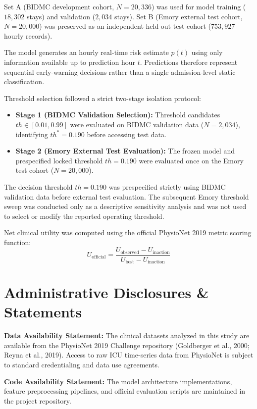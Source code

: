 \documentclass[11pt,a4paper]{article}
\begin{document}
Set A (BIDMC development cohort, $N=20,336$) was used for model training ($18,302$ stays) and validation ($2,034$ stays). Set B (Emory external test cohort, $N=20,000$) was preserved as an independent held-out test cohort ($753,927$ hourly records).

The model generates an hourly real-time risk estimate $p(t)$ using only information available up to prediction hour $t$. Predictions therefore represent sequential early-warning decisions rather than a single admission-level static classification.

Threshold selection followed a strict two-stage isolation protocol:
\begin{itemize}
    \item \textbf{Stage 1 (BIDMC Validation Selection):} Threshold candidates $th \in [0.01, 0.99]$ were evaluated on BIDMC validation data ($N=2,034$), identifying $th^*=0.190$ before accessing test data.
    \item \textbf{Stage 2 (Emory External Test Evaluation):} The frozen model and prespecified locked threshold $th=0.190$ were evaluated once on the Emory test cohort ($N=20,000$).
\end{itemize}

The decision threshold $th=0.190$ was prespecified strictly using BIDMC validation data before external test evaluation. The subsequent Emory threshold sweep was conducted only as a descriptive sensitivity analysis and was not used to select or modify the reported operating threshold.

Net clinical utility was computed using the official PhysioNet 2019 metric scoring function:
\begin{equation}
U_{\text{official}} = \frac{U_{\text{observed}} - U_{\text{inaction}}}{U_{\text{best}} - U_{\text{inaction}}}
\end{equation}

\section*{Administrative Disclosures \& Statements}

\textbf{Data Availability Statement:} The clinical datasets analyzed in this study are available from the PhysioNet 2019 Challenge repository (Goldberger et al., 2000; Reyna et al., 2019). Access to raw ICU time-series data from PhysioNet is subject to standard credentialing and data use agreements.

\textbf{Code Availability Statement:} The model architecture implementations, feature preprocessing pipelines, and official evaluation scripts are maintained in the project repository.
\end{document}
